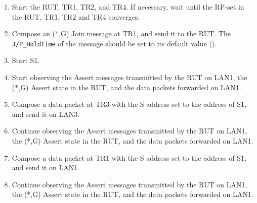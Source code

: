 \documentclass[11pt]{report}
\begin{document}
\begin{enumerate}

  \item Start the RUT, TR1, TR2, and TR4. If necessary, wait until the RP-set
  in the RUT, TR1, TR2 and TR4 converges.

  \item Compose an (*,G) Join message at TR1, and send it to the RUT.
  The \verb=J/P_HoldTime= of the message should be set to its default
  value ({\PimsmJPHoldTime}).

  \item Start S1.

  \item Start observing the Assert messages transmitted by the RUT on
  LAN1, the (*,G) Assert state in the RUT, and the data packets forwarded on
  LAN1. 

  \item Compose a data packet at TR3 with the S address set to the
  address of S1, and send it on LAN3.

  \item Continue observing the Assert messages transmitted by the RUT on
  LAN1, the (*,G) Assert state in the RUT, and the data packets forwarded on
  LAN1.

  \item Compose a data packet at TR1 with the S address set to the
  address of S1, and send it on LAN1.

  \item Continue observing the Assert messages transmitted by the RUT on
  LAN1, the (*,G) Assert state in the RUT, and the data packets forwarded on
  LAN1.

\end{enumerate}

\end{document}
